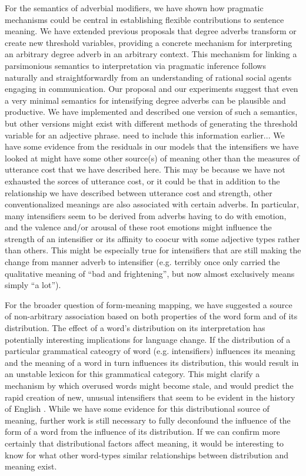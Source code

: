 \documentclass[10pt,letterpaper]{article}
\newcommand{\todo}[1]{{\color{red}#1}}
\begin{document}
For the semantics of adverbial modifiers, we have shown how pragmatic mechanisms could be central in establishing flexible contributions to sentence meaning.
We have extended previous proposals that degree adverbs transform or create new threshold variables, providing a concrete mechanism for interpreting an arbitrary degree adverb in an arbitrary context.
This mechanism for linking a parsimonious semantics to interpretation via pragmatic inference follows naturally and straightforwardly from an understanding of rational social agents engaging in communication.
Our proposal and our experiments suggest that even a very minimal semantics for intensifying degree adverbs can be plausible and productive.
We have implemented and described one version of such a semantics, but other versions might exist with different methods of generating the threshold variable for an adjective phrase.
\todo{need to include this information earlier...} We have some evidence from the residuals in our models that the intensifiers we have looked at might have some other source(s) of meaning other than the measures of utterance cost that we have described here. This may be because we have not exhausted the sorces of utterance cost, or it could be that in addition to the relationship we have described between utterance cost and strength, other conventionalized meanings are also associated with certain adverbs. In particular, many intensifiers seem to be derived from adverbs having to do with emotion, and the valence and/or arousal of these root emotions might influence the strength of an intensifier or its affinity to coocur with some adjective types rather than others. This might be especially true for intensifiers that are still making the change from manner adverb to intensifier (e.g. terribly once only carried the qualitative meaning of ``bad and frightening'', but now almost exclusively means simply ``a lot'').

For the broader question of form-meaning mapping, we have suggested a source of non-arbitrary association based on both properties of the word form and of its distribution. The effect of a word's distribution on its interpretation has potentially interesting implications for language change. If the distribution of a particular grammatical cateogry of word (e.g. intensifiers) influences its meaning and the meaning of a word in turn influences its distribution, this would result in an unstable lexicon for this grammatical category. This might clarify a mechanism by which overused words might become stale, and would predict the rapid creation of new, unusual intensifiers that seem to be evident in the history of English \cite{bolinger}. While we have some evidence for this distributional source of meaning, further work is still necessary to fully deconfound the influence of the form of a word from the influence of its distribution. If we can confirm more certainly that distributional factors affect meaning, it would be interesting to know for what other word-types similar relationships between distribution and meaning exist.
\end{document}
